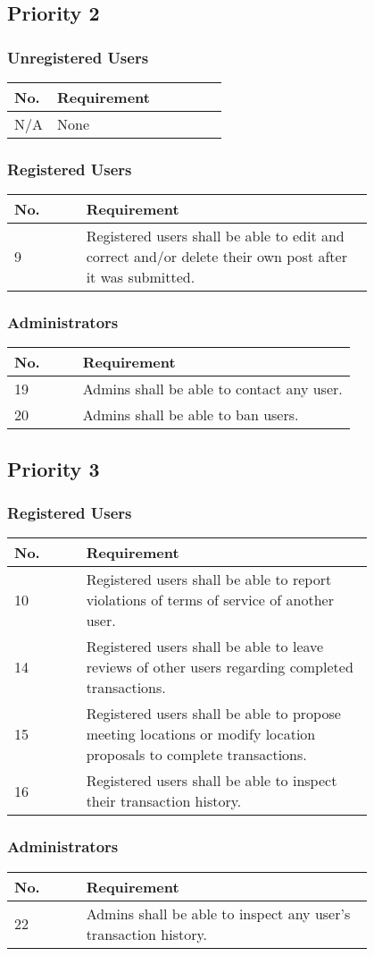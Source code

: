 \subsection{Priority 2}
\subsubsection{Unregistered Users}
\begin{tabular}{ | l | p{0.8\linewidth} | }
\hline
No. & Requirement\\\hline
N/A & None\\\hline
\end{tabular}
    
\subsubsection{Registered Users}
\begin{tabular}{ | l | p{0.8\linewidth} | }
\hline
No. & Requirement\\\hline
9 & Registered users shall be able to edit and correct and/or delete their own post after it was submitted.\\\hline
\end{tabular}
    
\subsubsection{Administrators}
\begin{tabular}{ | l | p{0.8\linewidth} | }
\hline
No. & Requirement\\\hline
19 & Admins shall be able to contact any user.\\\hline
20 & Admins shall be able to ban users.\\\hline
\end{tabular}

\subsection{Priority 3}

\subsubsection{Registered Users}
\begin{tabular}{ | l | p{0.8\linewidth} | }
\hline
No. & Requirement\\\hline
10 & Registered users shall be able to report violations of terms of service of another user.\\\hline
14 & Registered users shall be able to leave reviews of other users regarding completed transactions.\\\hline
15 & Registered users shall be able to propose meeting locations or modify location proposals to complete transactions.\\\hline
16 & Registered users shall be able to inspect their transaction history.\\\hline
\end{tabular}
    
\subsubsection{Administrators}
\begin{tabular}{ | l | p{0.8\linewidth} | }
\hline
No. & Requirement\\\hline
22 & Admins shall be able to inspect any user's transaction history.\\\hline
\end{tabular}
